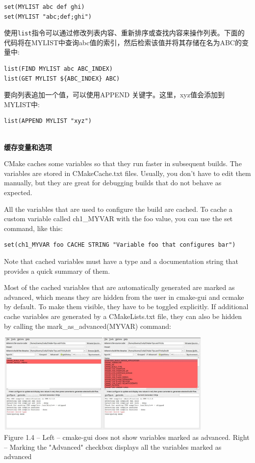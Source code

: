\begin{lstlisting}[style=styleCMake]
set(MYLIST abc def ghi)
set(MYLIST "abc;def;ghi")
\end{lstlisting}

使用\texttt{list}指令可以通过修改列表内容、重新排序或查找内容来操作列表。下面的代码将在MYLIST中查询abc值的索引，然后检索该值并将其存储在名为ABC的变量中:

\begin{lstlisting}[style=styleCMake]
list(FIND MYLIST abc ABC_INDEX)
list(GET MYLIST ${ABC_INDEX} ABC)
\end{lstlisting}

要向列表追加一个值，可以使用APPEND 关键字。这里，xyz值会添加到MYLIST中:

\begin{lstlisting}[style=styleCMake]
list(APPEND MYLIST "xyz")
\end{lstlisting}

\hspace*{\fill} \\ %
\noindent
\textbf{缓存变量和选项}

CMake caches some variables so that they run faster in subsequent builds. The variables are stored in CMakeCache.txt files. Usually, you don't have to edit them manually, but they are great for debugging builds that do not behave as expected. 

All the variables that are used to configure the build are cached. To cache a custom variable called ch1\_MYVAR with the foo value, you can use the set command, like this:

\begin{lstlisting}[style=styleCMake]
set(ch1_MYVAR foo CACHE STRING "Variable foo that configures bar")
\end{lstlisting}

Note that cached variables must have a type and a documentation string that provides
a quick summary of them.

Most of the cached variables that are automatically generated are marked as advanced, which means they are hidden from the user in cmake-gui and ccmake by default. To make them visible, they have to be toggled explicitly. If additional cache variables are generated by a CMakeLists.txt file, they can also be hidden by calling the mark\_as\_advanced(MYVAR) command:

\begin{center}
\includegraphics[width=0.8\textwidth]{content/1/chapter1/images/4.jpg}\\
Figure 1.4 – Left – cmake-gui does not show variables marked as advanced. Right – Marking the "Advanced" checkbox displays all the variables marked as advanced
\end{center}

